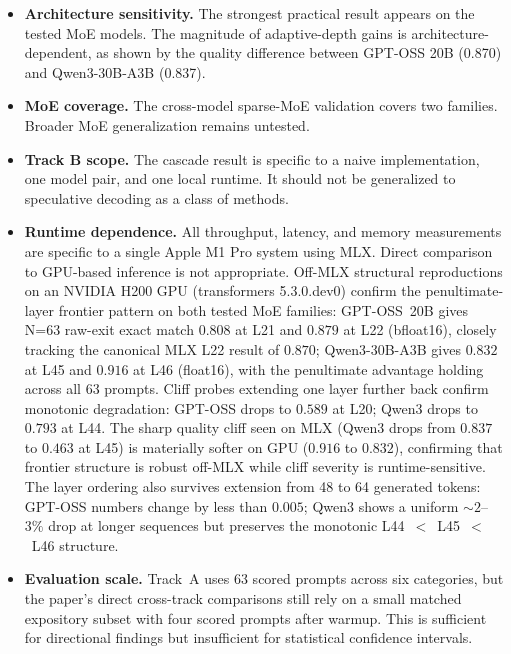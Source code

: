 \documentclass[11pt]{article}
\begin{document}
\begin{itemize}
\item \textbf{Architecture sensitivity.} The strongest practical result appears on the tested MoE models. The magnitude of adaptive-depth gains is architecture-dependent, as shown by the quality difference between GPT-OSS 20B (0.870) and Qwen3-30B-A3B (0.837).

\item \textbf{MoE coverage.} The cross-model sparse-MoE validation covers two families. Broader MoE generalization remains untested.

\item \textbf{Track B scope.} The cascade result is specific to a naive implementation, one model pair, and one local runtime. It should not be generalized to speculative decoding as a class of methods.

\item \textbf{Runtime dependence.} All throughput, latency, and memory measurements are specific to a single Apple M1 Pro system using MLX. Direct comparison to GPU-based inference is not appropriate. Off-MLX structural reproductions on an NVIDIA H200 GPU (transformers 5.3.0.dev0) confirm the penultimate-layer frontier pattern on both tested MoE families: GPT-OSS~20B gives N=63 raw-exit exact match $0.808$ at L21 and $0.879$ at L22 (bfloat16), closely tracking the canonical MLX L22 result of $0.870$; Qwen3-30B-A3B gives $0.832$ at L45 and $0.916$ at L46 (float16), with the penultimate advantage holding across all 63 prompts. Cliff probes extending one layer further back confirm monotonic degradation: GPT-OSS drops to $0.589$ at L20; Qwen3 drops to $0.793$ at L44. The sharp quality cliff seen on MLX (Qwen3 drops from $0.837$ to $0.463$ at L45) is materially softer on GPU ($0.916$ to $0.832$), confirming that frontier structure is robust off-MLX while cliff severity is runtime-sensitive. The layer ordering also survives extension from 48 to 64 generated tokens: GPT-OSS numbers change by less than $0.005$; Qwen3 shows a uniform $\sim\!2$--$3\%$ drop at longer sequences but preserves the monotonic L44~$<$~L45~$<$~L46 structure.

\item \textbf{Evaluation scale.} Track~A uses 63 scored prompts across six categories, but the paper's direct cross-track comparisons still rely on a small matched expository subset with four scored prompts after warmup. This is sufficient for directional findings but insufficient for statistical confidence intervals.


\end{itemize}
\end{document}
